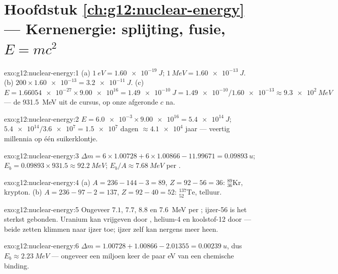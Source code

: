 \section*{Hoofdstuk \ref{ch:g12:nuclear-energy} --- Kernenergie: splijting, fusie, $E=mc^2$}

\begin{solution}{exo:g12:nuclear-energy:1}
(a) $\qty{1}{eV} = \qty{1.60e-19}{J}$; $\qty{1}{MeV} = \qty{1.60e-13}{J}$.
(b) $200 \times \num{1.60e-13} = \qty{3.2e-11}{J}$.
(c) $E = \num{1.66054e-27} \times \num{9.00e16} = \qty{1.49e-10}{J}
= \num{1.49e-10}/\num{1.60e-13} \approx \qty{9.3e2}{MeV}$ --- de
\qty{931.5}{MeV} uit de cursus, op onze afgeronde $c$ na.
\end{solution}

\begin{solution}{exo:g12:nuclear-energy:2}
$E = \num{6.0e-3} \times \num{9.00e16} = \qty{5.4e14}{J}$;
$\num{5.4e14}/\num{3.6e7} = \num{1.5e7}$ dagen $\approx \num{4.1e4}$ jaar ---
veertig millennia op één suikerklontje.
\end{solution}

\begin{solution}{exo:g12:nuclear-energy:3}
$\Delta m = 6 \times 1.00728 + 6 \times 1.00866 - 11.99671 =
\qty{0.09893}{u}$; $E_b = 0.09893 \times 931.5 \approx \qty{92.2}{MeV}$;
$E_b/A \approx \qty{7.68}{MeV}$ per .
\end{solution}

\begin{solution}{exo:g12:nuclear-energy:4}
(a) $A = 236 - 144 - 3 = 89$, $Z = 92 - 56 = 36$: ${}^{89}_{36}\mathrm{Kr}$,
krypton. (b) $A = 236 - 97 - 2 = 137$, $Z = 92 - 40 = 52$:
${}^{137}_{52}\mathrm{Te}$, telluur.
\end{solution}

\begin{solution}{exo:g12:nuclear-energy:5}
Ongeveer $7.1$, $7.7$, $8.8$ en \qty{7.6}{MeV} per ; ijzer-56 is het
sterkst gebonden. Uranium kan  vrijgeven door , helium-4
en koolstof-12 door  --- beide zetten klimmen naar ijzer toe; ijzer
zelf kan nergens meer heen.
\end{solution}

\begin{solution}{exo:g12:nuclear-energy:6}
$\Delta m = 1.00728 + 1.00866 - 2.01355 = \qty{0.00239}{u}$, dus
$E_b \approx \qty{2.23}{MeV}$ --- ongeveer een miljoen keer de paar \unit{eV}
van een chemische binding.
\end{solution}

